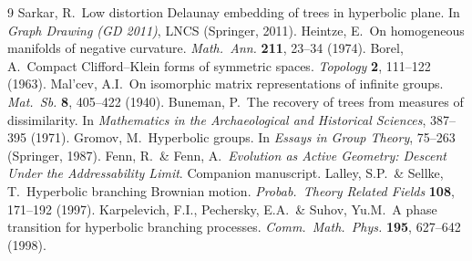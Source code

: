 \documentclass[11pt,reqno]{amsart}
\theoremstyle{plain}
\theoremstyle{definition}
\begin{document}
\begin{thebibliography}{9}
 Sarkar, R.\ Low distortion Delaunay embedding of trees in hyperbolic plane. In \emph{Graph Drawing (GD 2011)}, LNCS (Springer, 2011).
 Heintze, E.\ On homogeneous manifolds of negative curvature. \emph{Math.\ Ann.} \textbf{211}, 23--34 (1974).
 Borel, A.\ Compact Clifford--Klein forms of symmetric spaces. \emph{Topology} \textbf{2}, 111--122 (1963).
 Mal'cev, A.I.\ On isomorphic matrix representations of infinite groups. \emph{Mat.\ Sb.} \textbf{8}, 405--422 (1940).
 Buneman, P.\ The recovery of trees from measures of dissimilarity. In \emph{Mathematics in the Archaeological and Historical Sciences}, 387--395 (1971).
 Gromov, M.\ Hyperbolic groups. In \emph{Essays in Group Theory}, 75--263 (Springer, 1987).
 Fenn, R.\ \& Fenn, A.\ \emph{Evolution as Active Geometry: Descent Under the Addressability Limit}. Companion manuscript.
 Lalley, S.P.\ \& Sellke, T.\ Hyperbolic branching Brownian motion. \emph{Probab.\ Theory Related Fields} \textbf{108}, 171--192 (1997).
 Karpelevich, F.I., Pechersky, E.A.\ \& Suhov, Yu.M.\ A phase transition for hyperbolic branching processes. \emph{Comm.\ Math.\ Phys.} \textbf{195}, 627--642 (1998).
\end{thebibliography}
\end{document}
